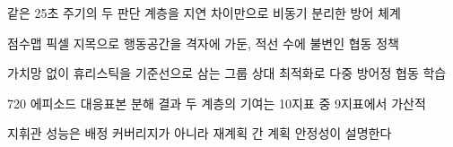 
\begin{highlights}
\item 같은 25초 주기의 두 판단 계층을 지연 차이만으로 비동기 분리한 방어 체계
\item 점수맵 픽셀 지목으로 행동공간을 격자에 가둔, 적선 수에 불변인 협동 정책
\item 가치망 없이 휴리스틱을 기준선으로 삼는 그룹 상대 최적화로 다중 방어정 협동 학습
\item 720 에피소드 대응표본 분해 결과 두 계층의 기여는 10지표 중 9지표에서 가산적
\item 지휘관 성능은 배정 커버리지가 아니라 재계획 간 계획 안정성이 설명한다
\end{highlights}
